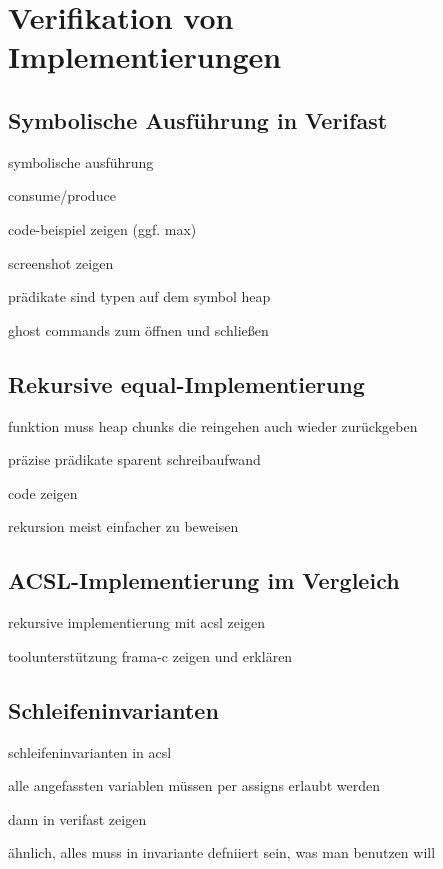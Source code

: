 ﻿\section{Verifikation von Implementierungen}

\subsection{Symbolische Ausführung in Verifast}

symbolische ausführung

consume/produce

code-beispiel zeigen (ggf. max)

screenshot zeigen

prädikate sind typen auf dem symbol heap

ghost commands zum öffnen und schließen

\subsection{Rekursive equal-Implementierung}

funktion muss heap chunks die reingehen auch wieder zurückgeben



präzise prädikate sparent schreibaufwand

code zeigen

rekursion meist einfacher zu beweisen

\subsection{ACSL-Implementierung im Vergleich}

rekursive implementierung mit acsl zeigen

toolunterstützung frama-c zeigen und erklären

\subsection{Schleifeninvarianten}

schleifeninvarianten in acsl

alle angefassten variablen müssen per assigns erlaubt werden

dann in verifast zeigen

ähnlich, alles muss in invariante defniiert sein, was man benutzen will

